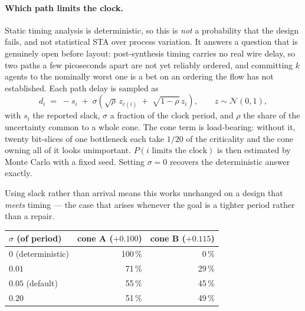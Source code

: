 \documentclass[11pt,a4paper]{article}
\begin{document}
\paragraph{Which path limits the clock.}
Static timing analysis is deterministic, so this is \emph{not} a probability
that the design fails, and not statistical STA over process variation. It
answers a question that is genuinely open before layout: post-synthesis timing
carries no real wire delay, so two paths a few picoseconds apart are not yet
reliably ordered, and committing $k$ agents to the nominally worst one is a bet
on an ordering the flow has not established. Each path delay is sampled as
%
\begin{equation}
d_i \;=\; -s_i \;+\; \sigma\!\left(\sqrt{\rho}\, z_{c(i)} \;+\; \sqrt{1-\rho}\, z_i\right),
\qquad z \sim \mathcal{N}(0,1),
\end{equation}
%
with $s_i$ the reported slack, $\sigma$ a fraction of the clock period, and
$\rho$ the share of the uncertainty common to a whole cone. The cone term is
load-bearing: without it, twenty bit-slices of one bottleneck each take
$1/20$ of the criticality and the cone owning all of it looks unimportant.
$P(\text{$i$ limits the clock})$ is then estimated by Monte Carlo with a fixed
seed. Setting $\sigma=0$ recovers the deterministic answer exactly.

Using slack rather than arrival means this works unchanged on a design that
\emph{meets} timing --- the case that arises whenever the goal is a tighter
period rather than a repair.

\begin{center}
\begin{tabular}{@{}lrr@{}}
\toprule
$\sigma$ (of period) & cone A ($+0.100$) & cone B ($+0.115$) \\
\midrule
$0$ (deterministic) & 100\,\% & 0\,\% \\
$0.01$ & 71\,\% & 29\,\% \\
$0.05$ (default) & 55\,\% & 45\,\% \\
$0.20$ & 51\,\% & 49\,\% \\
\bottomrule
\end{tabular}
\end{center}
\end{document}
